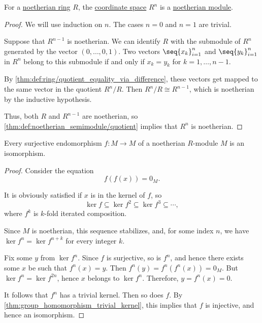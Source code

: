 \begin{proposition}\label{thm:noetherian_free_module}
  For a \hyperref[def:noetherian_semiring]{noetherian ring} \( R \), the \hyperref[def:coordinate_space]{coordinate space} \( R^n \) is a \hyperref[def:noetherian_semimodule]{noetherian module}.
\end{proposition}
\begin{proof}
  We will use induction on \( n \). The cases \( n = 0 \) and \( n = 1 \) are trivial.

  Suppose that \( R^{n-1} \) is noetherian. We can identify \( R \) with the submodule of \( R^n \) generated by the vector \( (0, \ldots, 0, 1) \). Two vectors \( \seq{ x_k }_{i=1}^n \) and  \( \seq{ y_k }_{i=1}^n \) in \( R^n \) belong to this submodule if and only if \( x_k = y_k \) for \( k = 1, \ldots, n - 1 \).

  By \cref{thm:def:ring/quotient_equality_via_difference}, these vectors get mapped to the same vector in the quotient \( R^n / R \). Then \( R^n / R \cong R^{n-1} \), which is noetherian by the inductive hypothesis.

  Thus, both \( R \) and \( R^{n-1} \) are noetherian, so \cref{thm:def:noetherian_semimodule/quotient} implies that \( R^n \) is noetherian.
\end{proof}

\begin{lemma}\label{thm:surjective_endomorphism_over_noetherian_module}
  Every surjective endomorphism \( f: M \to M \) of a noetherian \( R \)-module \( M \) is an isomorphism.
\end{lemma}
\begin{proof}
  Consider the equation
  \begin{equation*}
    f(f(x)) = 0_M.
  \end{equation*}

  It is obviously satisfied if \( x \) is in the kernel of \( f \), so
  \begin{equation*}
    \ker f \subseteq \ker f^2 \subseteq \ker f^3 \subseteq \cdots,
  \end{equation*}
  where \( f^k \) is \( k \)-fold iterated composition.

  Since \( M \) is noetherian, this sequence stabilizes, and, for some index \( n \), we have \( \ker f^n = \ker f^{n + k} \) for every integer \( k \).

  Fix some \( y \) from \( \ker f^n \). Since \( f \) is surjective, so is \( f^n \), and hence there exists some \( x \) be such that \( f^n(x) = y \). Then \( f^n(y) = f^n(f^n(x)) = 0_M \). But \( \ker f^n = \ker f^{2n} \), hence \( x \) belongs to \( \ker f^n \). Therefore, \( y = f^n(x) = 0 \).

  It follows that \( f^n \) has a trivial kernel. Then so does \( f \). By \cref{thm:group_homomorphism_trivial_kernel}, this implies that \( f \) is injective, and hence an isomorphism.
\end{proof}

